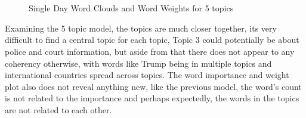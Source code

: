 \begin{figure}[H]
	\centering
	\\
	\\
	
	\caption{Single Day Word Clouds and Word Weights for 5 topics}
	\label{fig:single5}
\end{figure}	

Examining the 5 topic model, the topics are much closer together, its very difficult to find a central topic for each topic, Topic 3 could potentially be about police and court information, but aside from that there does not appear to any coherency otherwise, with words like Trump being in multiple topics and international countries spread across topics. The word importance and weight plot also does not reveal anything new, like the previous model, the word's count is not related to the importance and perhaps expectedly, the words in the topics are not related to each other.


